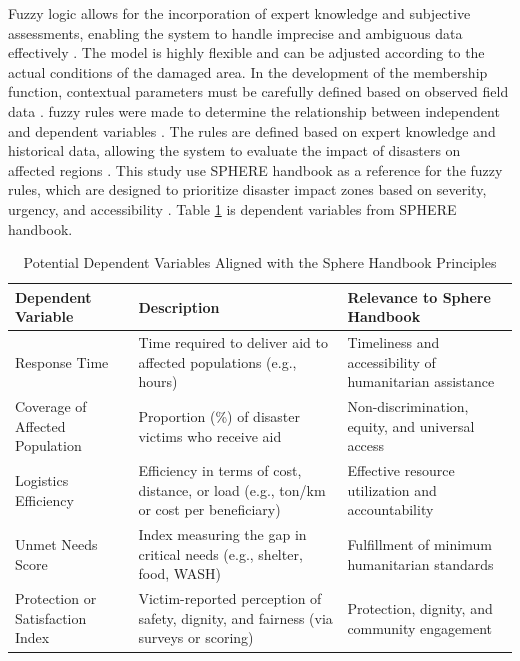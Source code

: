 \documentclass[journal,final,a4paper,twoside,11pt]{IEEEtran}
\begin{document}
Fuzzy logic allows for the incorporation of expert knowledge and subjective assessments, enabling the system to handle imprecise and ambiguous data effectively \cite{jain2020membership}. The model is highly flexible and can be adjusted according to the actual conditions of the damaged area. In the development of the membership function, contextual parameters must be carefully defined based on observed field data \cite{amiri2021application}. fuzzy rules were made to determine the relationship between independent and dependent variables \cite{yoon2023novel}. The rules are defined based on expert knowledge and historical data, allowing the system to evaluate the impact of disasters on affected regions \cite{wang2024gis}. This study use SPHERE handbook as a reference for the fuzzy rules, which are designed to prioritize disaster impact zones based on severity, urgency, and accessibility \cite{sphere2018pdf}. Table \ref{tab:dependent_variables_sphere} is dependent variables from SPHERE handbook.

\begin{table}[H]
\caption{Potential Dependent Variables Aligned with the Sphere Handbook Principles}
\begin{center}
\begin{tabular}{|p{2cm}|p{2cm}|p{2cm}|}
\hline
\textbf{Dependent Variable} & \textbf{Description} & \textbf{Relevance to Sphere Handbook} \\
\hline
Response Time & Time required to deliver aid to affected populations (e.g., hours) & Timeliness and accessibility of humanitarian assistance \\
\hline
Coverage of Affected Population & Proportion (\%) of disaster victims who receive aid & Non-discrimination, equity, and universal access \\
\hline
Logistics Efficiency & Efficiency in terms of cost, distance, or load (e.g., ton/km or cost per beneficiary) & Effective resource utilization and accountability \\
\hline
Unmet Needs Score & Index measuring the gap in critical needs (e.g., shelter, food, WASH) & Fulfillment of minimum humanitarian standards \\
\hline
Protection or Satisfaction Index & Victim-reported perception of safety, dignity, and fairness (via surveys or scoring) & Protection, dignity, and community engagement \\
\hline
\end{tabular}
\label{tab:dependent_variables_sphere}
\end{center}
\end{table}
\end{document}
